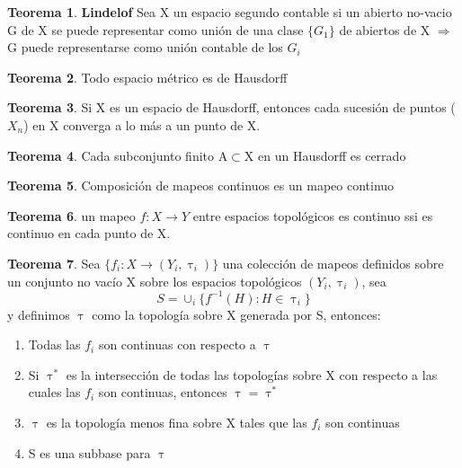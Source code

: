 \documentclass{article}
\theoremstyle{definition}
\newtheorem{theorem}{Teorema}[section]
\begin{document}

\begin{theorem}{\textbf{Lindelof}}
	Sea X un espacio segundo contable si un abierto no-vacio G de X se puede representar como unión de una clase $\{G_1\}$ de abiertos de X $\Rightarrow$ G puede representarse como unión contable de los $G_i$
\end{theorem}


\begin{theorem}
	Todo espacio métrico es de Hausdorff 
\end{theorem}


\begin{theorem}
	Si X es un espacio de Hausdorff, entonces cada sucesión de puntos ($X_n$) en X converga a lo más a un punto de X.
\end{theorem}


\begin{theorem}
	Cada subconjunto finito A$\subset$X en un Hausdorff es cerrado
\end{theorem}


\begin{theorem}
	Composición de mapeos continuos es un mapeo continuo
\end{theorem}


\begin{theorem}
	 un mapeo $f:X\to Y$ entre espacios topológicos es continuo ssi es continuo en cada punto de X.
\end{theorem}


\begin{theorem}
	Sea $\{f_i:X\to(Y_i,\uptau_i)\}$ una colección de mapeos definidos sobre un conjunto no vacío X sobre los espacios topológicos $(Y_i,\uptau_i)$, sea 
	\[S=\cup_i \{f^{-1}(H):H\in\uptau_i\}\]
	y definimos $\uptau$ como la topología sobre X generada por S, entonces:
	\begin{enumerate}
	\item Todas las $f_i$ son continuas con respecto a $\uptau$
	\item Si $\uptau^*$ es la intersección de todas las topologías sobre X con respecto a las cuales las $f_i$ son continuas, entonces $\uptau=\uptau^*$
	\item $\uptau$ es la topología menos fina sobre X tales que las $f_i$ son continuas
	\item S es una subbase para $\uptau$
	\end{enumerate}
\end{theorem}
\end{document}
